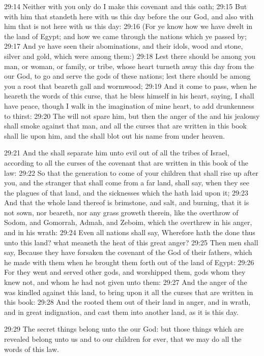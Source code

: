 29:14 Neither with you only do I make this covenant and this oath;
29:15 But with him that standeth here with us this day before the \LORD
our God, and also with him that is not here with us this day: 29:16
(For ye know how we have dwelt in the land of Egypt; and how we came
through the nations which ye passed by; 29:17 And ye have seen their
abominations, and their idols, wood and stone, silver and gold, which
were among them:) 29:18 Lest there should be among you man, or woman,
or family, or tribe, whose heart turneth away this day from the \LORD
our God, to go and serve the gods of these nations; lest there should
be among you a root that beareth gall and wormwood; 29:19 And it come
to pass, when he heareth the words of this curse, that he bless
himself in his heart, saying, I shall have peace, though I walk in the
imagination of mine heart, to add drunkenness to thirst: 29:20 The
\LORD will not spare him, but then the anger of the \LORD and his
jealousy shall smoke against that man, and all the curses that are
written in this book shall lie upon him, and the \LORD shall blot out
his name from under heaven.

29:21 And the \LORD shall separate him unto evil out of all the tribes
of Israel, according to all the curses of the covenant that are
written in this book of the law: 29:22 So that the generation to come
of your children that shall rise up after you, and the stranger that
shall come from a far land, shall say, when they see the plagues of
that land, and the sicknesses which the \LORD hath laid upon it; 29:23
And that the whole land thereof is brimstone, and salt, and burning,
that it is not sown, nor beareth, nor any grass groweth therein, like
the overthrow of Sodom, and Gomorrah, Admah, and Zeboim, which the
\LORD overthrew in his anger, and in his wrath: 29:24 Even all nations
shall say, Wherefore hath the \LORD done thus unto this land? what
meaneth the heat of this great anger?  29:25 Then men shall say,
Because they have forsaken the covenant of the \LORD God of their
fathers, which he made with them when he brought them forth out of the
land of Egypt: 29:26 For they went and served other gods, and
worshipped them, gods whom they knew not, and whom he had not given
unto them: 29:27 And the anger of the \LORD was kindled against this
land, to bring upon it all the curses that are written in this book:
29:28 And the \LORD rooted them out of their land in anger, and in
wrath, and in great indignation, and cast them into another land, as
it is this day.

29:29 The secret things belong unto the \LORD our God: but those things
which are revealed belong unto us and to our children for ever, that
we may do all the words of this law.

